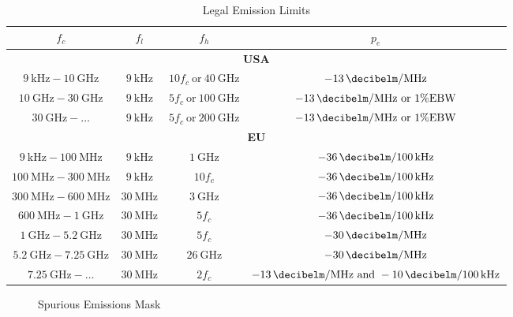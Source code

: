 \begin{table}
\centering
\caption{Legal Emission Limits}
\label{tab:legusa}
\begin{tabular}{|c|c|c|c|}
\hline
$f_c$  &  $f_l$ & $f_h$ & $p_e$ \\\hline
\multicolumn{4}{|c|}{\textbf{USA}} \\\hline
$\SI{9}{\kilo\hertz}-\SI{10}{\giga\hertz}$ & $\SI{9}{\kilo\hertz}$ & $10f_c\ \text{or}\ \SI{40}{\giga\hertz}$ & $\SI{-13}{\decibelm\per\mega\hertz}$ \\\hline
$\SI{10}{\giga\hertz}-\SI{30}{\giga\hertz}$ & $\SI{9}{\kilo\hertz}$ & $5f_c\ \text{or}\ \SI{100}{\giga\hertz}$ & $\SI{-13}{\decibelm\per\mega\hertz}\ \text{or}\ 1\% \text{EBW}$ \\\hline
$\SI{30}{\giga\hertz}-\dots$ & $\SI{9}{\kilo\hertz}$ & $5f_c\ \text{or}\ \SI{200}{\giga\hertz}$ & $\SI{-13}{\decibelm\per\mega\hertz}\ \text{or}\ 1\% \text{EBW}$ \\\hline
\multicolumn{4}{|c|}{\textbf{EU}} \\\hline
$\SI{9}{\kilo\hertz}-\SI{100}{\mega\hertz}$ & $\SI{9}{\kilo\hertz}$ & $\SI{1}{\giga\hertz}$ & $\SI{-36}{\decibelm\per \SI{100}{\kilo\hertz}}$ \\\hline
$\SI{100}{\mega\hertz}-\SI{300}{\mega\hertz}$ & $\SI{9}{\kilo\hertz}$ & $10f_c$ & $\SI{-36}{\decibelm\per \SI{100}{\kilo\hertz}}$ \\\hline
$\SI{300}{\mega\hertz}-\SI{600}{\mega\hertz}$ & $\SI{30}{\mega\hertz}$ & $\SI{3}{\giga\hertz}$ & $\SI{-36}{\decibelm\per \SI{100}{\kilo\hertz}}$ \\\hline
$\SI{600}{\mega\hertz}-\SI{1}{\giga\hertz}$ & $\SI{30}{\mega\hertz}$ & $5f_c$ & $\SI{-36}{\decibelm\per \SI{100}{\kilo\hertz}}$ \\\hline
$\SI{1}{\giga\hertz}-\SI{5.2}{\giga\hertz}$ & $\SI{30}{\mega\hertz}$ & $5f_c$ & $\SI{-30}{\decibelm\per\mega\hertz}$ \\\hline
$\SI{5.2}{\giga\hertz}-\SI{7.25}{\giga\hertz}$ & $\SI{30}{\mega\hertz}$ & $\SI{26}{\giga\hertz}$ & $\SI{-30}{\decibelm\per\mega\hertz}$ \\\hline
$\SI{7.25}{\giga\hertz}-\dots$ & $\SI{30}{\mega\hertz}$ & $2f_c$ & $\SI{-13}{\decibelm\per\mega\hertz}\ \text{and}\ \SI{-10}{\decibelm\per \SI{100}{\kilo\hertz}}$ \\\hline
\end{tabular}
\end{table}

\begin{figure}
\centering
\def\svgwidth{0.9\textwidth}

\caption{Spurious Emissions Mask}
\label{fig:sem}
\end{figure}








